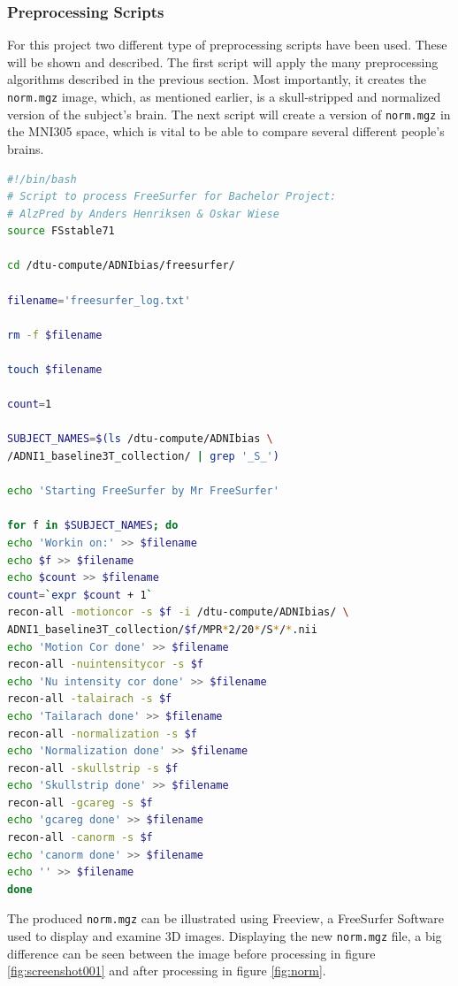 \documentclass[12pt, fleqn, titlepage]{article}
\newcommand{\1}[1]{\mathds{1}\left[#1\right]}
\begin{document}
\subsubsection{Preprocessing Scripts}
For this project two different type of preprocessing scripts have been used. These will be shown and described. The first script will apply the many preprocessing algorithms described in the previous section. Most importantly, it creates the \texttt{norm.mgz} image, which, as mentioned earlier, is a skull-stripped and normalized version of the subject's brain. The next script will create a version of \texttt{norm.mgz} in the MNI305 space, which is vital to be able to compare several different people's brains.

\begin{lstlisting}[language=bash,caption={FreeSurfer Preprocessing}]
#!/bin/bash 
# Script to process FreeSurfer for Bachelor Project:
# AlzPred by Anders Henriksen & Oskar Wiese
source FSstable71

cd /dtu-compute/ADNIbias/freesurfer/

filename='freesurfer_log.txt'

rm -f $filename

touch $filename

count=1

SUBJECT_NAMES=$(ls /dtu-compute/ADNIbias \ 
/ADNI1_baseline3T_collection/ | grep '_S_')

echo 'Starting FreeSurfer by Mr FreeSurfer' 

for f in $SUBJECT_NAMES; do
echo 'Workin on:' >> $filename
echo $f >> $filename
echo $count >> $filename 
count=`expr $count + 1`
recon-all -motioncor -s $f -i /dtu-compute/ADNIbias/ \
ADNI1_baseline3T_collection/$f/MPR*2/20*/S*/*.nii 
echo 'Motion Cor done' >> $filename
recon-all -nuintensitycor -s $f  
echo 'Nu intensity cor done' >> $filename
recon-all -talairach -s $f 
echo 'Tailarach done' >> $filename
recon-all -normalization -s $f 
echo 'Normalization done' >> $filename
recon-all -skullstrip -s $f     
echo 'Skullstrip done' >> $filename
recon-all -gcareg -s $f  
echo 'gcareg done' >> $filename
recon-all -canorm -s $f  
echo 'canorm done' >> $filename
echo '' >> $filename
done 
\end{lstlisting}

\noindent
The produced \texttt{norm.mgz} can be illustrated using Freeview, a FreeSurfer Software used to display and examine 3D images. Displaying the new \texttt{norm.mgz} file, a big difference can be seen between the image before processing in figure \ref{fig:screenshot001} and after processing in figure \ref{fig:norm}.
\end{document}
